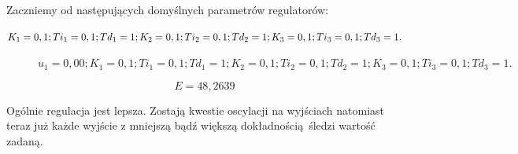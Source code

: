 Zaczniemy od następujących domyślnych parametrów regulatorów:

\medskip

\begin{math}
K_1 = 0,1; \\
    Ti_1 = 0,1; \\
    Td_1 = 1; \\
    K_2 = 0,1; \\
    Ti_2 = 0,1; \\
    Td_2 = 1; \\
    K_3 = 0,1; \\
    Ti_3 = 0,1; \\
    Td_3 = 1. \\
\end{math}

%     



\begin{figure}[H]
    \centering
    
    \caption{$u_1 = 0,00; K_1 = 0,1; Ti_1 = 0,1; Td_1 = 1; K_2 = 0,1; Ti_2 = 0,1; Td_2 = 1; K_3 = 0,1; Ti_3 = 0,1; Td_3 = 1.$}
\end{figure}

\begin{equation}
    E = 48,2639
\end{equation}

Ogólnie regulacja jest lepsza. Zostają kwestie oscylacji na wyjściach natomiast teraz już każde wyjście z mniejszą bądź większą dokładnością śledzi wartość zadaną.

%     

